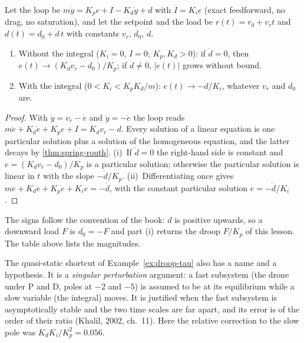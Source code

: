 \begin{theorem}
\label{thm:droop-errors}
Let the loop be $m\ddot y = K_p e + I - K_d\dot y + d$ with $\dot I = K_i e$ (exact feedforward, no drag, no saturation), and let the setpoint and the load be $r(t) = r_0 + v_r t$ and $d(t) = d_0 + \dot d\,t$ with constants $v_r$, $d_0$, $\dot d$.
\begin{enumerate}[label=(\roman*)]
  \item Without the integral ($K_i = 0$, $I = 0$; $K_p, K_d > 0$): if $\dot d = 0$, then $e(t) \to (K_d v_r - d_0)/K_p$; if $\dot d \ne 0$, $|e(t)|$ grows without bound.
  \item With the integral ($0 < K_i < K_p K_d/m$): $e(t) \to -\dot d/K_i$, whatever $v_r$ and $d_0$ are.
\end{enumerate}
\end{theorem}
\begin{proof}
With $\dot y = v_r - \dot e$ and $\ddot y = -\ddot e$ the loop reads $m\ddot e + K_d\dot e + K_p e + I = K_d v_r - d$. Every solution of a linear equation is one particular solution plus a solution of the homogeneous equation, and the latter decays by \cref{thm:spring-routh}. (i)~If $\dot d = 0$ the right-hand side is constant and $e = (K_d v_r - d_0)/K_p$ is a particular solution; otherwise the particular solution is linear in $t$ with the slope $-\dot d/K_p$. (ii)~Differentiating once gives $m\dddot e + K_d\ddot e + K_p\dot e + K_i e = -\dot d$, with the constant particular solution $e = -\dot d/K_i$.
\end{proof}

The signs follow the convention of the book: $d$ is positive upwards, so a downward load $F$ is $d_0 = -F$ and part (i) returns the droop $F/K_p$ of this lesson. The table above lists the magnitudes.

The quasi-static shortcut of Example~\ref{ex:droop-tau} also has a name and a hypothesis. It is a \emph{singular perturbation} argument: a fast subsystem (the drone under P and D, poles at $-2$ and $-5$) is assumed to be at its equilibrium while a slow variable (the integral) moves. It is justified when the fast subsystem is asymptotically stable and the two time scales are far apart, and its error is of the order of their ratio (Khalil, 2002, ch.~11). Here the relative correction to the slow pole was $K_d K_i/K_p^2 = 0.056$.

